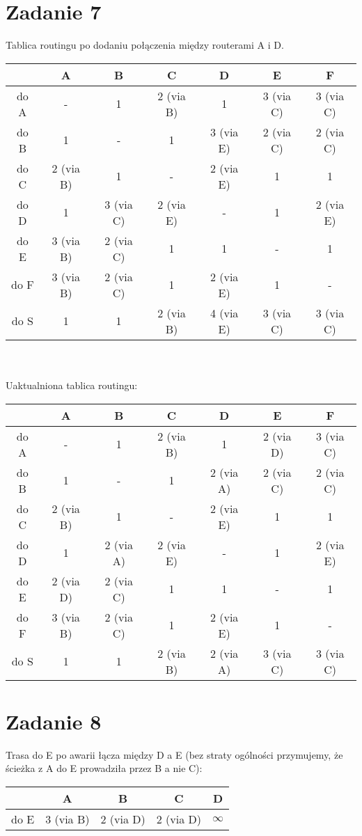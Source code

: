 \documentclass[11pt,wide]{article}
\begin{document}
\section{Zadanie 7}
Tablica routingu po dodaniu połączenia między routerami A i D. \\
\begin{tabular}{|c|c|c|c|c|c|c|}\hline
 & A & B & C & D & E & F\\
\hline 
do A & - & 1 & 2 (via B) & 1  & 3 (via C) &  3 (via C)\\
\hline 
do B & 1 & - & 1 & 3 (via E) & 2 (via C) & 2 (via C)\\
\hline 
do C & 2 (via B) & 1 & - & 2 (via E) & 1 & 1\\
\hline 
do D & 1 & 3 (via C) & 2 (via E) & - & 1 & 2 (via E)\\
\hline 
do E & 3 (via B) & 2 (via C) & 1 & 1 & - & 1\\
\hline
do F & 3 (via B) & 2 (via C) & 1 & 2 (via E) & 1 & -\\
\hline
do S & 1 & 1 & 2 (via B) & 4 (via E) & 3 (via C) & 3 (via C) \\
\hline
\end{tabular}\\\\

Uaktualniona tablica routingu: \\
\begin{tabular}{|c|c|c|c|c|c|c|}\hline
 & A & B & C & D & E & F\\
\hline 
do A & - & 1 & 2 (via B) & 1 & 2 (via D) &  3 (via C)\\
\hline 
do B & 1 & - & 1 & 2 (via A) & 2 (via C) & 2 (via C)\\
\hline 
do C & 2 (via B) & 1 & - & 2 (via E) & 1 & 1\\
\hline 
do D & 1 & 2 (via A) & 2 (via E) & - & 1 & 2 (via E)\\
\hline 
do E & 2 (via D) & 2 (via C) & 1 & 1 & - & 1\\
\hline
do F & 3 (via B) & 2 (via C) & 1 & 2 (via E) & 1 & -\\
\hline
do S & 1 & 1 & 2 (via B) & 2 (via A) & 3 (via C) & 3 (via C) \\
\hline
\end{tabular}


\section{Zadanie 8}
Trasa do E po awarii łącza między D a E (bez straty ogólności przymujemy, że ścieżka z A do E prowadziła przez B a nie C):\\
\begin{tabular}{|c|c|c|c|c|}\hline
 & A & B & C & D \\
 \hline
 do E & 3 (via B) & 2 (via D) & 2 (via D) & $\infty$\\
 \hline
\end{tabular}\\
\end{document}

